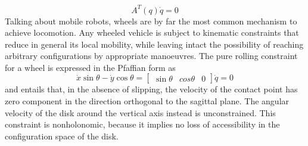 \begin{equation*} 
	A^T \left( q \right)\dot{q} =0  
\end{equation*}
Talking about mobile robots, wheels are by far the most common mechanism to achieve locomotion. Any wheeled vehicle is subject to kinematic constraints that reduce in general its local mobility, while leaving intact the possibility of reaching arbitrary configurations by appropriate manoeuvres.
The pure rolling constraint for a wheel is expressed in the Pfaffian form as 
\begin{equation} 
	\dot{x}\sin\theta-\dot{y}\cos\theta=\left[
	\begin{matrix}
		\sin\theta & cos\theta & 0
	\end{matrix}
	\right] \dot{q}=0
\end{equation}
and entails that, in the absence of slipping, the velocity of the contact point has zero component in the direction orthogonal to the sagittal plane. The angular velocity of the disk around the vertical axis instead is unconstrained.
This constraint is nonholonomic, because it implies no loss of accessibility in the configuration space of the disk.

